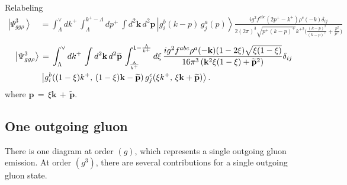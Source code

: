 \documentclass[10pt]{article}
\numberwithin{equation}{section}
\begin{document}
Relabeling 
\begin{align}
\left|\Psi_{gg\rho}^{3}\right\rangle \,& =\int_{\Lambda}^{\vee}dk^{+}\,\int_{\Lambda}^{k^{+}-\Lambda}dp^{+}\,\int d^{2}\mathbf{k}\, d^{2}\mathbf{p}\,\left|g_{i}^{b}(k-p)\, g_{j}^{a}(p)\right\rangle  \frac{ig^{2}f^{abc}(2p^{+}-k^{+})\rho^{c}(-k)\delta_{ij}}{2(2\pi)^{3}\sqrt{p^{+}(k-p)^{+}}k^{+ 2}\bigg(\frac{(k-p)^{2}}{(k-p)^{+}}+\frac{p^{2}}{p^{+}}\bigg)}
\end{align}
\begin{align}\label{contgg3}
\left|\Psi_{gg\rho}^{3}\right\rangle \,& =\,\int_{\Lambda}^{\vee}dk^{+}\,\int d^{2}\mathbf{k}\,d^{2}\widetilde{\mathbf{p}}\,\int_{\frac{\Lambda}{k^{+}}}^{1-\frac{\Lambda}{k^{+}}}d\xi\,\frac{ig^{2}f^{abc}\rho^{a}(-\mathbf{k})(1-2\xi)\sqrt{\xi(1-\xi)}}{16\pi^{3}\left(\mathbf{k}^{2}\xi(1-\xi)+\widetilde{\mathbf{p}}^{2}\right)}\delta_{ij}\notag \\ & \left|g_{i}^{b}((1-\xi)k^{+},\,(1-\xi)\mathbf{k}-\widetilde{\mathbf{p}})\,g_{j}^{c}(\xi k^{+},\,\xi\mathbf{k}+\widetilde{\mathbf{p}})\right\rangle .\end{align}
where $\mathbf{p}\,=\,\xi \mathbf{k}\,+\,\widetilde{\mathbf{p}}$. 
\subsection{One outgoing gluon}
There is one diagram at order $(g)$, which represents a single outgoing gluon emission. At order $(g^{3})$, there are several contributions for a single outgoing gluon state. 
\end{document}
